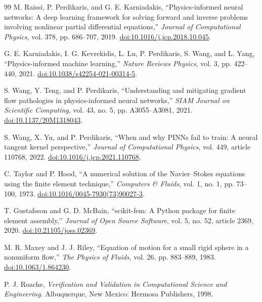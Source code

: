 \clearpage
\renewcommand{\bibname}{References}
\begin{thebibliography}{99}
M. Raissi, P. Perdikaris, and G. E. Karniadakis,
``Physics-informed neural networks: A deep learning framework for solving
forward and inverse problems involving nonlinear partial differential
equations,'' \emph{Journal of Computational Physics}, vol. 378,
pp. 686--707, 2019.
\href{https://doi.org/10.1016/j.jcp.2018.10.045}{doi:10.1016/j.jcp.2018.10.045}.

G. E. Karniadakis, I. G. Kevrekidis, L. Lu, P. Perdikaris, S. Wang, and
L. Yang, ``Physics-informed machine learning,'' \emph{Nature Reviews
Physics}, vol. 3, pp. 422--440, 2021.
\href{https://doi.org/10.1038/s42254-021-00314-5}{doi:10.1038/s42254-021-00314-5}.

S. Wang, Y. Teng, and P. Perdikaris, ``Understanding and mitigating gradient
flow pathologies in physics-informed neural networks,'' \emph{SIAM Journal
on Scientific Computing}, vol. 43, no. 5, pp. A3055--A3081, 2021.
\href{https://doi.org/10.1137/20M1318043}{doi:10.1137/20M1318043}.

S. Wang, X. Yu, and P. Perdikaris, ``When and why PINNs fail to train:
A neural tangent kernel perspective,'' \emph{Journal of Computational
Physics}, vol. 449, article 110768, 2022.
\href{https://doi.org/10.1016/j.jcp.2021.110768}{doi:10.1016/j.jcp.2021.110768}.

C. Taylor and P. Hood, ``A numerical solution of the Navier--Stokes equations
using the finite element technique,'' \emph{Computers \& Fluids}, vol. 1,
no. 1, pp. 73--100, 1973.
\href{https://doi.org/10.1016/0045-7930(73)90027-3}{doi:10.1016/0045-7930(73)90027-3}.

T. Gustafsson and G. D. McBain, ``scikit-fem: A Python package for finite
element assembly,'' \emph{Journal of Open Source Software}, vol. 5,
no. 52, article 2369, 2020.
\href{https://doi.org/10.21105/joss.02369}{doi:10.21105/joss.02369}.

M. R. Maxey and J. J. Riley, ``Equation of motion for a small rigid sphere
in a nonuniform flow,'' \emph{The Physics of Fluids}, vol. 26,
pp. 883--889, 1983.
\href{https://doi.org/10.1063/1.864230}{doi:10.1063/1.864230}.

P. J. Roache, \emph{Verification and Validation in Computational Science
and Engineering}. Albuquerque, New Mexico: Hermosa Publishers, 1998.
\end{thebibliography}
